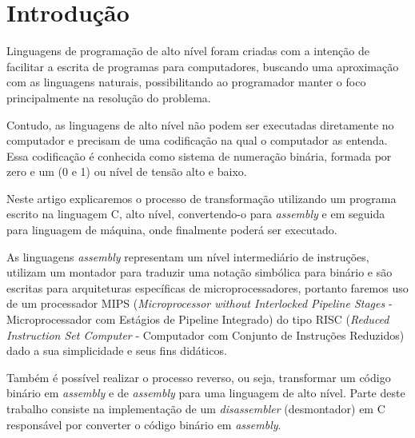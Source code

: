 \section{Introdução} \label{sec_introducao}
Linguagens de programação de alto nível foram criadas com a intenção de facilitar a escrita de programas para computadores, buscando uma aproximação com as linguagens naturais, possibilitando ao programador manter o foco principalmente na resolução do problema. 

Contudo, as linguagens de alto nível não podem ser executadas diretamente no computador e precisam de uma codificação na qual o computador as entenda. Essa codificação é conhecida como sistema de numeração binária, formada por zero e um (0 e 1) ou nível de tensão alto e baixo. 

Neste artigo explicaremos o processo de transformação utilizando um programa escrito na linguagem C, alto nível, convertendo-o para \textit{assembly} e em seguida para linguagem de máquina, onde finalmente poderá ser executado.

As linguagens \textit{assembly} representam um nível intermediário de instruções, utilizam um montador para traduzir uma notação simbólica para binário e são escritas para arquiteturas específicas de microprocessadores, portanto faremos uso de um processador MIPS (\textit{Microprocessor without Interlocked Pipeline Stages} - Microprocessador com Estágios de Pipeline Integrado) do tipo RISC (\textit{Reduced Instruction Set Computer} - Computador com Conjunto de Instruções Reduzidos) dado a sua simplicidade e seus fins didáticos. 

Também é possível realizar o processo reverso, ou seja, transformar um código binário em \textit{assembly} e de \textit{assembly} para uma linguagem de alto nível. Parte deste trabalho consiste na implementação de um \textit{disassembler} (desmontador) em C responsável por converter o código binário em \textit{assembly}.


